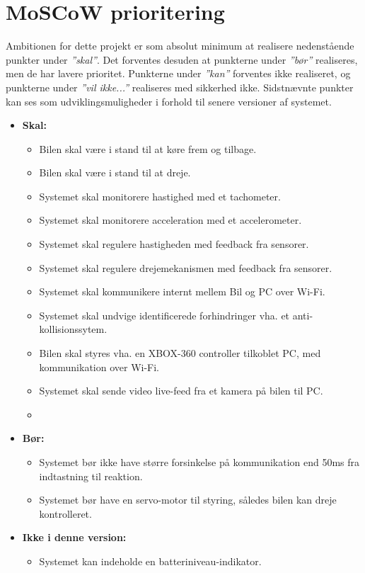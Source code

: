 
\section*{MoSCoW prioritering} \label{sec:moscow_prioritering}

Ambitionen for dette projekt er som absolut minimum at realisere nedenstående punkter under \textit{''skal''}. 
Det forventes desuden at punkterne under \textit{''bør''} realiseres, men de har lavere prioritet.
Punkterne under \textit{''kan''} forventes ikke realiseret, og punkterne under \textit{''vil ikke...''} realiseres med sikkerhed ikke. 
Sidstnævnte punkter kan ses som udviklingsmuligheder i forhold til senere versioner af systemet. 

\begin{itemize}\itemsep1pt \parskip0pt 
	\item \textbf{Skal:}
		\begin{itemize}\itemsep1pt \parskip0pt 
			\item Bilen skal være i stand til at køre frem og tilbage.
			\item Bilen skal være i stand til at dreje.
			\item Systemet skal monitorere hastighed med et tachometer.
			\item Systemet skal monitorere acceleration med et accelerometer.
			\item Systemet skal regulere hastigheden med feedback fra sensorer.
			\item Systemet skal regulere drejemekanismen med feedback fra sensorer.
			\item Systemet skal kommunikere internt mellem Bil og PC over Wi-Fi.
			\item Systemet skal undvige identificerede forhindringer vha. et anti-kollisionssytem. 
			\item Bilen skal styres vha. en XBOX-360 controller tilkoblet PC, med kommunikation over Wi-Fi.
			\item Systemet skal sende video live-feed fra et kamera på bilen til PC.
			\item 
		\end{itemize}
	\item \textbf{Bør:}
		\begin{itemize}\itemsep1pt \parskip0pt 
			\item Systemet bør ikke have større forsinkelse på kommunikation end 50ms fra indtastning til reaktion.
			\item Systemet bør have en servo-motor til styring, således bilen kan dreje kontrolleret.
		\end{itemize}
	\item \textbf{Ikke i denne version:}	
		\begin{itemize}\itemsep1pt \parskip0pt 
			\item Systemet kan indeholde en batteriniveau-indikator.
		\end{itemize}
\end{itemize}
